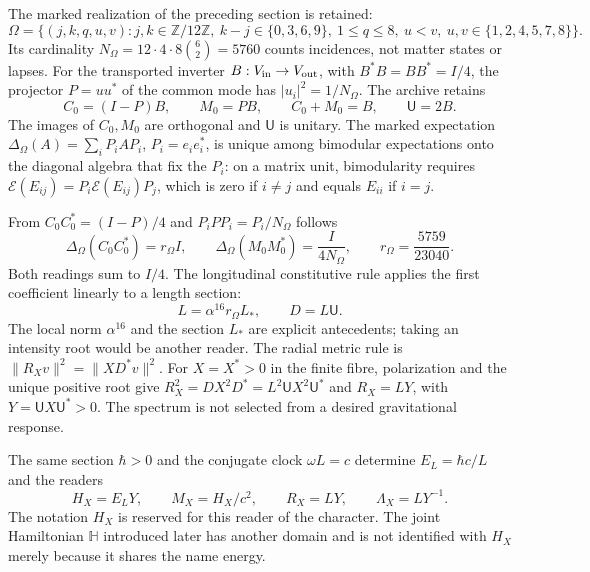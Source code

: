The marked realization of the preceding section is retained:
\[
\Omega=\{(j,k,q,u,v):j,k\in\mathbb Z/12\mathbb Z,\ 
k-j\in\{0,3,6,9\},\ 1\leq q\leq8,\ 
u<v,\ u,v\in\{1,2,4,5,7,8\}\}.
\]
Its cardinality $N_\Omega=12\cdot4\cdot8\binom62=5760$ counts incidences, not matter states or lapses. For the transported inverter $B:V_{\rm in}\to V_{\rm out}$, with $B^*B=BB^*=I/4$, the projector $P=uu^*$ of the common mode has $|u_i|^2=1/N_\Omega$. The archive retains
\[
C_0=(I-P)B,\qquad M_0=PB,\qquad C_0+M_0=B,\qquad\mathsf U=2B.
\]
The images of $C_0,M_0$ are orthogonal and $\mathsf U$ is unitary. The marked expectation $\Delta_\Omega(A)=\sum_iP_iAP_i$, $P_i=e_ie_i^*$, is unique among bimodular expectations onto the diagonal algebra that fix the $P_i$: on a matrix unit, bimodularity requires $\mathcal E(E_{ij})=P_i\mathcal E(E_{ij})P_j$, which is zero if $i\ne j$ and equals $E_{ii}$ if $i=j$.

From $C_0C_0^*=(I-P)/4$ and
$P_iPP_i=P_i/N_\Omega$ follows
\begin{equation}
\Delta_\Omega(C_0C_0^*)=r_\Omega I,\qquad
\Delta_\Omega(M_0M_0^*)=\frac{I}{4N_\Omega},\qquad
r_\Omega=\frac{5759}{23040}.
\label{hmtcuatro:gea:retorno}
\end{equation}
Both readings sum to $I/4$. The longitudinal constitutive rule applies the first coefficient linearly to a length section:
\begin{equation}
L=\alpha^{16}r_\Omega L_*,\qquad D=L\mathsf U.
\label{hmtcuatro:gea:longitud}
\end{equation}
The local norm $\alpha^{16}$ and the section $L_*$ are explicit antecedents; taking an intensity root would be another reader. The radial metric rule is $\|R_Xv\|^2=\|XD^*v\|^2$. For $X=X^*>0$ in the finite fibre, polarization and the unique positive root give $R_X^2=DX^2D^*=L^2\mathsf UX^2\mathsf U^*$ and $R_X=LY$, with $Y=\mathsf UX\mathsf U^*>0$. The spectrum is not selected from a desired gravitational response.

The same section $\hbar>0$ and the conjugate clock $\omega L=c$ determine $E_L=\hbar c/L$ and the readers
\begin{equation}
H_X=E_LY,\qquad M_X=H_X/c^2,\qquad
R_X=LY,\qquad\Lambda_X=LY^{-1}.
\label{hmtcuatro:gea:lectores}
\end{equation}
The notation $H_X$ is reserved for this reader of the character. The joint Hamiltonian $\mathbb H$ introduced later has another domain and is not identified with $H_X$ merely because it shares the name energy.

